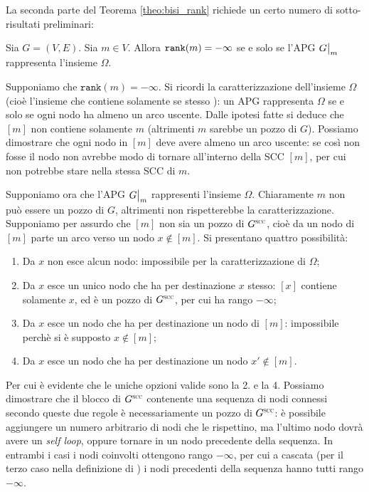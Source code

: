 La seconda parte del Teorema \ref{theo:bisi_rank} richiede un certo numero di sotto-risultati preliminari:
\begin{proposition}
    \label{prop:omega_rank}
    Sia $G = (V,E)$. Sia $m \in V$. Allora $\verb|rank|(m) = -\infty$ se e solo se l'APG $\restr{G}{m}$ rappresenta l'insieme $\Omega$.
\end{proposition}
\begin{proof2}
    Supponiamo che $\texttt{rank}(m) = - \infty$. Si ricordi la caratterizzazione dell'insieme $\Omega$ (cioè l'insieme che contiene solamente se stesso \cite{aczel}): un APG rappresenta $\Omega$ se e solo se ogni nodo ha almeno un arco uscente. Dalle ipotesi fatte si deduce che $[m]$ non contiene solamente $m$ (altrimenti $m$ sarebbe un pozzo di $G$). Possiamo dimostrare che ogni nodo in $[m]$ deve avere almeno un arco uscente: se così non fosse il nodo non avrebbe modo di tornare all'interno della SCC $[m]$, per cui non potrebbe stare nella stessa SCC di $m$.

    Supponiamo ora che l'APG $\restr{G}{m}$ rappresenti l'insieme $\Omega$. Chiaramente $m$ non può essere un pozzo di $G$, altrimenti non rispetterebbe la caratterizzazione. Supponiamo per assurdo che $[m]$ non sia un pozzo di $G^{\superscc}$, cioè da un nodo di $[m]$ parte un arco verso un nodo $x \not\in [m]$. Si presentano quattro possibilità:
    \begin{enumerate}
        \item Da $x$ non esce alcun nodo: impossibile per la caratterizzazione di $\Omega$;
        \item Da $x$ esce un unico nodo che ha per destinazione $x$ stesso: $[x]$ contiene solamente $x$, ed è un pozzo di $G^{\superscc}$, per cui ha rango $-\infty$;
        \item Da $x$ esce un nodo che ha per destinazione un nodo di $[m]$: impossibile perchè si è supposto $x \not\in [m]$;
        \item Da $x$ esce un nodo che ha per destinazione un nodo $x' \not\in [m]$.
    \end{enumerate}
    Per cui è evidente che le uniche opzioni valide sono la 2. \hspace{-0.4cm} e la 4. Possiamo dimostrare che il blocco di $G^{\superscc}$ contenente una sequenza di nodi connessi secondo queste due regole è necessariamente un pozzo di $G^{\superscc}$: è possibile aggiungere un numero arbitrario di nodi che le rispettino, ma l'ultimo nodo dovrà avere un \emph{self loop}, oppure tornare in un nodo precedente della sequenza. In entrambi i casi i nodi coinvolti ottengono rango $-\infty$, per cui a cascata (per il terzo caso nella definizione di \rankfunc) i nodi precedenti della sequenza hanno tutti rango $-\infty$.
\end{proof2}

